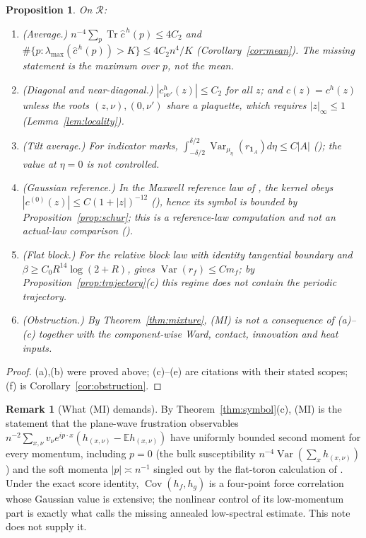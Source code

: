 \documentclass[11pt]{article}
\newtheorem{proposition}[theorem]{Proposition}
\theoremstyle{definition}
\newtheorem{remark}[theorem]{Remark}
\newcommand{\E}{\mathbb{E}}
\newcommand{\Var}{\operatorname{Var}}
\newcommand{\Cov}{\operatorname{Cov}}
\newcommand{\Tr}{\operatorname{Tr}}
\newcommand{\lam}{\lambda_{\max}}
\begin{document}
\begin{proposition}\label{prop:known}
On $\mathcal R$:
\begin{enumerate}
\item[(a)] (Average.) $n^{-4}\sum_p\Tr\hat c^{\,h}(p)\le4C_2$ and $\#\{p:\lam(\hat c^{\,h}(p))>K\}\le4C_2n^4/K$
(Corollary~\ref{cor:mean}). The missing statement is the \emph{maximum} over $p$, not the mean.
\item[(b)] (Diagonal and near-diagonal.) $|c^h_{\nu\nu'}(z)|\le C_2$ for all $z$; and $c(z)=c^h(z)$ unless the
roots $(z,\nu),(0,\nu')$ share a plaquette, which requires $|z|_\infty\le1$ (Lemma~\ref{lem:locality}).
\item[(c)] (Tilt average.) For indicator marks, $\int_{-\delta/2}^{\delta/2}\Var_{\mu_\eta}(r_{\mathbf 1_A})d\eta\le C|A|$
(\cite[Part~VI, (T17)]{csj}); the value at $\eta=0$ is not controlled.
\item[(d)] (Gaussian reference.) In the Maxwell reference law of \cite[Part~III]{csj}, the kernel obeys
$|c^{(0)}(z)|\le C(1+|z|)^{-12}$ (\cite[Part~III, (2.7)]{csj}), hence its symbol is bounded by Proposition~\ref{prop:schur}; this is a
reference-law computation and not an actual-law comparison (\cite[subsection ``Relation to the unresolved compact susceptibility'']{gau}).
\item[(e)] (Flat block.) For the relative block law with identity tangential boundary and
$\beta\ge C_0R^{14}\log(2+R)$, \cite[block theorem of Section~2]{spw} gives $\Var(r_f)\le Cm_f$; by
Proposition~\ref{prop:trajectory}(c) this regime does not contain the periodic trajectory.
\item[(f)] (Obstruction.) By Theorem~\ref{thm:mixture}, (MI) is not a consequence of (a)--(c) together with the
component-wise Ward, contact, innovation and heat inputs.
\end{enumerate}
\end{proposition}
\begin{proof}
(a),(b) were proved above; (c)--(e) are citations with their stated scopes; (f) is Corollary~\ref{cor:obstruction}.
\end{proof}

\begin{remark}[What (MI) demands]
By Theorem~\ref{thm:symbol}(c), (MI) is the statement that the plane-wave frustration observables
$n^{-2}\sum_{x,\nu}v_\nu e^{ip\cdot x}(h_{(x,\nu)}-\E h_{(x,\nu)})$ have uniformly bounded second moment for every
momentum, including $p=0$ (the bulk susceptibility $n^{-4}\Var(\sum_{x}h_{(x,\nu)})$) and the soft momenta
$|p|\asymp n^{-1}$ singled out by the flat-toron calculation of \cite[proposition on a nonzero quadratic defect at a flat toron]{tra}. Under the exact score
identity, $\Cov(h_f,h_g)$ is a four-point force correlation whose Gaussian value is extensive; the nonlinear
control of its low-momentum part is exactly what \cite[Part~III, subsection ``What a nonlinear upgrade would have to \dots'']{csj} calls the missing
annealed low-spectral estimate. This note does not supply it.
\end{remark}
\end{document}
